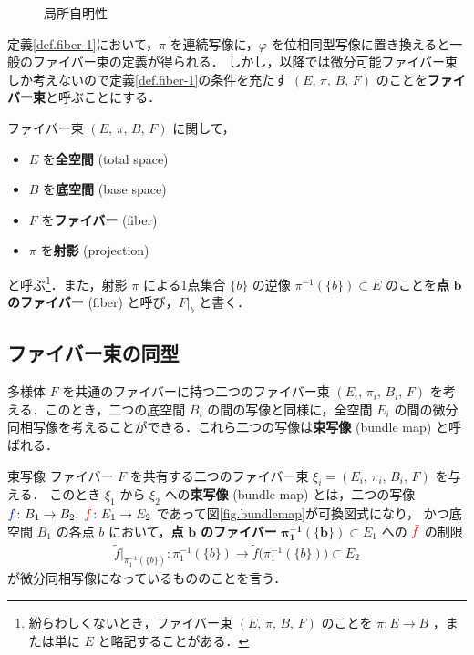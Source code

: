 \documentclass[geometry_main]{subfiles}
\begin{document}
\begin{figure}[H]
	\centering
	\caption{局所自明性}
	\label{fig.fiber1}
\end{figure}%

\begin{marker}
	定義\ref{def.fiber-1}において，$\pi$ を連続写像に，$\varphi$ を位相同型写像に置き換えると一般のファイバー束の定義が得られる．
	しかし，以降では微分可能ファイバー束しか考えないので定義\ref{def.fiber-1}の条件を充たす $(E,\, \pi ,\, B,\, F)$ のことを\textbf{ファイバー束}と呼ぶことにする．
\end{marker}

ファイバー束 $(E,\, \pi ,\, B,\, F)$ に関して，
\begin{itemize}
	\item $E$ を\textbf{全空間} (total space)
	\item $B$ を\textbf{底空間} (base space)
	\item $F$ を\textbf{ファイバー} (fiber)
	\item $\pi$ を\textbf{射影} (projection)
\end{itemize}
と呼ぶ\footnote{紛らわしくないとき，ファイバー束 $(E,\, \pi,\, B,\, F)$ のことを $\pi \colon E \to B$ ，または単に $E$ と略記することがある．}．また，射影 $\pi$ による1点集合 $\{b\}$ の逆像 $\pi^{-1}(\{b\}) \subset E$ のことを\textbf{点} $\bm{b}$ \textbf{のファイバー} (fiber) と呼び，$F|_b$ と書く．\label{def:point-fiber}

\subsection{ファイバー束の同型}

\cinfty 多様体 $F$ を共通のファイバーに持つ二つのファイバー束 $(E_i,\, \pi_i,\, B_i,\, F)$ を考える．このとき，二つの底空間 $B_i$ の間の\cinfty 写像と同様に，全空間 $E_i$ の間の微分同相写像を考えることができる．これら二つの\cinfty 写像は\textbf{束写像} (bundle map) と呼ばれる．

\begin{mydef}[label=def.bundlemap]{束写像}
	ファイバー $F$ を共有する二つのファイバー束 $\xi_i = (E_i,\, \pi_i,\, B_i,\, F)$ を与える．
	このとき $\xi_1$ から $\xi_2$ への\textbf{束写像} (bundle map) とは，二つの\cinfty 写像 $\textcolor{blue}{f} \colon B_1 \to B_2,\; \textcolor{red}{\tilde{f}} \colon E_1 \to E_2$ であって図\ref{fig.bundlemap}が可換図式になり，
	かつ底空間 $B_1$ の各点 $b$ において，\textbf{点} $\bm{b}$ \textbf{のファイバー} $\bm{\pi_1^{-1}(\{b\})} \subset E_1$ への $\textcolor{red}{\tilde{f}}$ の制限 
	\begin{align}
		\tilde{f}|_{\pi_1^{-1}(\{b\})} \colon \pi_1^{-1}(\{b\}) \to \tilde{f} \bigl( \pi_1^{-1}(\{b\}) \bigr) \subset E_2
	\end{align}
	が微分同相写像になっているもののことを言う．
\end{mydef}
\end{document}
